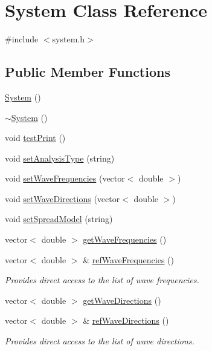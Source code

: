 \hypertarget{class_system}{\section{System Class Reference}
\label{class_system}
}


{\ttfamily \#include $<$system.\-h$>$}

\subsection*{Public Member Functions}
\begin{DoxyCompactItemize}
\item 
\hyperlink{class_system_ae317936c9bcf1374d61745572e0f2f8a}{System} ()
\item 
\hyperlink{class_system_a3be70bb338e3f062f821173fd15680d0}{$\sim$\-System} ()
\item 
void \hyperlink{class_system_a20bda2428f8aef211bf8787e1efeeeee}{test\-Print} ()
\item 
void \hyperlink{class_system_ae58c969c9ba0a1ec4bebff64b88a22ed}{set\-Analysis\-Type} (string)
\item 
void \hyperlink{class_system_ab1bfe916791d4c61bb807c930f73930c}{set\-Wave\-Frequencies} (vector$<$ double $>$)
\item 
void \hyperlink{class_system_a492b1dc5f789192ff6207f2555b23138}{set\-Wave\-Directions} (vector$<$ double $>$)
\item 
void \hyperlink{class_system_a2c26340bdbd94e6bed0f75dba991b49c}{set\-Spread\-Model} (string)
\item 
vector$<$ double $>$ \hyperlink{class_system_a18b18022b6468a41dfdbfc49c881b933}{get\-Wave\-Frequencies} ()
\item 
vector$<$ double $>$ \& \hyperlink{class_system_aa8af03fa5a3e8d6154d88987060a03e8}{ref\-Wave\-Frequencies} ()
\begin{DoxyCompactList}\small\item\em Provides direct access to the list of wave frequencies. \end{DoxyCompactList}\item 
vector$<$ double $>$ \hyperlink{class_system_a8e1d633a4b604223236e4cc4de35bd70}{get\-Wave\-Directions} ()
\item 
vector$<$ double $>$ \& \hyperlink{class_system_a660da11fb839d3efe76f4ab62be8bb23}{ref\-Wave\-Directions} ()
\begin{DoxyCompactList}\small\item\em Provides direct access to the list of wave directions. \end{DoxyCompactList}\item 

\end{DoxyCompactItemize}
